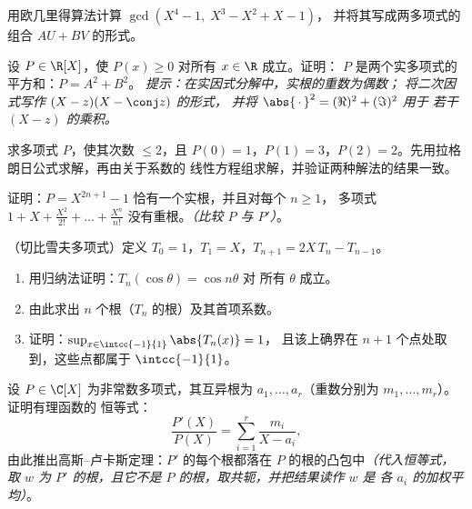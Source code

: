 \begin{exercise}[$\star\star$]\label{exo:b1:poly:6}
用欧几里得算法计算 $\gcd(X^4 - 1,\; X^3 - X^2 + X - 1)$，
并将其写成两多项式的组合
$AU + BV$ 的形式。
\end{exercise}

\begin{exercise}[$\star\star$]\label{exo:b1:poly:7}
设 $P \in \R[X]$，使 $P(x) \geq 0$ 对所有 $x \in \R$ 成立。证明：
$P$ 是两个实多项式的平方和：$P = A^2 + B^2$。
\emph{提示：在实因式分解中，实根的重数为偶数；
将二次因式写作 $(X - z)(X - \conj z)$ 的形式，
并将 $\abs{\,\cdot\,}^2 = (\Re)^2 + (\Im)^2$ 用于
若干 $(X - z)$ 的乘积。}
\end{exercise}

\begin{exercise}[$\star\star$]\label{exo:b1:poly:8}
求多项式 $P$，使其次数 $\leq 2$，且 $P(0) = 1$，$P(1) =
3$，$P(2) = 2$。先用拉格朗日公式求解，再由关于系数的
线性方程组求解，并验证两种解法的结果一致。
\end{exercise}

\begin{exercise}[$\star\star$]\label{exo:b1:poly:9}
证明：$P = X^{2n+1} - 1$ 恰有一个实根，并且对每个 $n \geq 1$，
多项式 $1 + X + \frac{X^2}{2!} + \dots +
\frac{X^n}{n!}$ 没有重根。\emph{（比较 $P$ 与
$P'$）}。
\end{exercise}

\begin{exercise}[$\star\star\star$]\label{exo:b1:poly:10}
（切比雪夫多项式）定义 $T_0 = 1$，$T_1 = X$，$T_{n+1} =
2X\,T_n - T_{n-1}$。
\begin{enumerate}
  \item 用归纳法证明：$T_n(\cos\theta) = \cos n\theta$ 对
        所有 $\theta$ 成立。
  \item 由此求出 $n$ 个根（$T_n$ 的根）及其首项系数。
  \item 证明：$\sup_{x \in \intcc{-1}{1}} \abs{T_n(x)} = 1$，
        且该上确界在 $n + 1$ 个点处取到，这些点都属于 $\intcc{-1}{1}$。
\end{enumerate}
\end{exercise}

\begin{exercise}[$\star\star\star$]\label{exo:b1:poly:11}
设 $P \in \C[X]$ 为非常数多项式，其互异根为 $a_1, \dots,
a_r$（重数分别为 $m_1, \dots, m_r$）。证明有理函数的
恒等式：
\[
\frac{P'(X)}{P(X)} = \sum_{i=1}^{r} \frac{m_i}{X - a_i},
\]
由此推出高斯--卢卡斯定理：$P'$ 的每个根都落在
$P$ 的根的凸包中\emph{（代入恒等式，取 $w$ 为 $P'$ 的根，且它不是
$P$ 的根，取共轭，并把结果读作 $w$ 是
各 $a_i$ 的加权平均）}。
\end{exercise}

